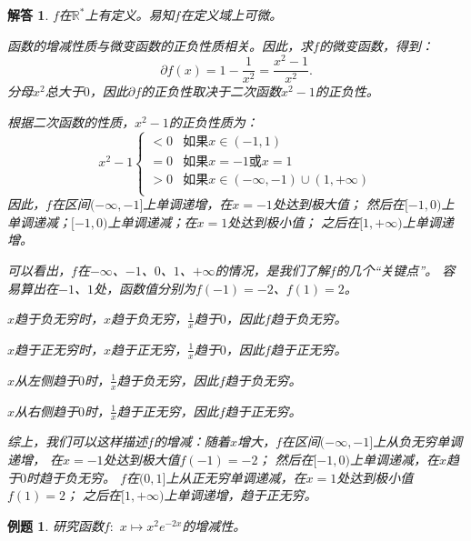 \documentclass[12pt,UTF8]{ctexbook}
\newtheorem{et}{例题}[section]
\newtheorem*{so}{解答}
\begin{document}
\begin{so}
    $f$在$\mathbb{R}^*$上有定义。易知$f$在定义域上可微。

    函数的增减性质与微变函数的正负性质相关。因此，求$f$的微变函数，得到：
    $$ \partial f(x) = 1 - \frac{1}{x^2} = \frac{x^2 - 1}{x^2}.$$
    分母$ x^2 $总大于$0$，因此$ \partial f $的正负性取决于二次函数$x^2 - 1$的正负性。
    
    根据二次函数的性质，$x^2 - 1$的正负性质为：
    $$ x^2 - 1 \left\{
        \begin{array}{cl}
            < 0 & \mbox{如果}x \in (-1, 1) \\
            = 0 & \mbox{如果}x = -1 \mbox{或} x = 1 \\
            > 0 & \mbox{如果}x \in (-\infty, -1)\cup (1, +\infty)\\
        \end{array}\right.
    $$
    因此，$f$在区间$(-\infty, -1]$上单调递增，在$x = -1$处达到极大值；
    然后在$[-1, 0)$上单调递减；$[-1, 0)$上单调递减；在$x = 1$处达到极小值；
    之后在$[1, +\infty)$上单调递增。

    可以看出，$f$在$-\infty$、$-1$、$0$、$1$、$+\infty$的情况，是我们了解$f$的几个“关键点”。
    容易算出在$-1$、$1$处，函数值分别为$f(-1) = -2$、$f(1) = 2$。
    
    $x$趋于负无穷时，$x$趋于负无穷，$\frac{1}{x}$趋于$0$，因此$f$趋于负无穷。

    $x$趋于正无穷时，$x$趋于正无穷，$\frac{1}{x}$趋于$0$，因此$f$趋于正无穷。

    $x$从左侧趋于$0$时，$\frac{1}{x}$趋于负无穷，因此$f$趋于负无穷。
    
    $x$从右侧趋于$0$时，$\frac{1}{x}$趋于正无穷，因此$f$趋于正无穷。

    综上，我们可以这样描述$f$的增减：随着$x$增大，$f$在区间$(-\infty, -1]$上从负无穷单调递增，
    在$x = -1$处达到极大值$f(-1) = -2$；
    然后在$[-1, 0)$上单调递减，在$x$趋于$0$时趋于负无穷。
    $f$在$(0, 1]$上从正无穷单调递减，在$x = 1$处达到极小值$f(1) = 2$；
    之后在$[1, +\infty)$上单调递增，趋于正无穷。
\end{so}

\begin{et}
    研究函数$f:\,\,x\mapsto x^2 e^{-2x}$的增减性。
\end{et}
\end{document}
